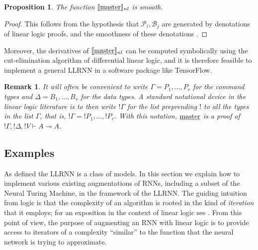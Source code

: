 \documentclass[english,letter paper,12pt,leqno]{article}
\newtheorem{proposition}[theorem]{Proposition}
\theoremstyle{example}
\newtheorem{remark}[theorem]{Remark}
\numberwithin{equation}{section}
\begin{document}
\begin{proposition} The function $\llbracket \underline{\textup{master}} \rrbracket_{nl}$ is smooth.
\end{proposition}
\begin{proof}
This follows from the hypothesis that $\mathscr{P}_i, \mathscr{B}_j$ are generated by denotations of linear logic proofs, and the smoothness of these denotations \cite{murfetclift}.
\end{proof}

Moreover, the derivatives of $\llbracket \underline{\textup{master}} \rrbracket_{nl}$ can be computed symbolically using the cut-elimination algorithm of differential linear logic, and it is therefore feasible to implement a general LLRNN in a software package like TensorFlow. 

\begin{remark}\label{remark:sequentbang} It will often be convenient to write $\Gamma = P_1, \ldots, P_r$ for the command types and $\Delta = B_1, \ldots, B_s$ for the data types. A standard notational device in the linear logic literature is to then write ${!} \Gamma$ for the list preprending ${!}$ to all the types in the list $\Gamma$, that is, ${!} \Gamma = {!} P_1, \ldots, {!} P_r$. With this notation, $\underline{\textup{master}}$ is a proof of ${!} \Gamma, {!} \Delta, {!} V \vdash A \multimap A$.
\end{remark}

\subsection{Examples}

As defined the LLRNN is a class of models. In this section we explain how to implement various existing augmentations of RNNs, including a subset of the Neural Turing Machine, in the framework of the LLRNN. The guiding intuition from logic is that the complexity of an algorithm is rooted in the kind of \emph{iteration} that it employs; for an exposition in the context of linear logic see \cite[\S 7]{murfet_ll}. From this point of view, the purpose of augmenting an RNN with linear logic is to provide access to iterators of a complexity ``similar'' to the function that the neural network is trying to approximate.
\end{document}
